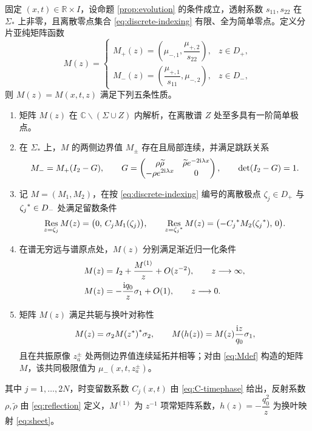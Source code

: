 \begin{proposition}\label{prop:jump}
固定 $(x,t)\in\mathbb R\times I$，设命题 \ref{prop:evolution} 的条件成立，透射系数 $s_{11},s_{22}$ 在 $\Sigma_*$ 上非零，且离散零点集合 \eqref{eq:discrete-indexing} 有限、全为简单零点。定义分片亚纯矩阵函数
\begin{equation}\label{eq:Mdef}
M(z)=\begin{cases}
M_+(z)=\left(\mu_{-,1},\dfrac{\mu_{+,2}}{s_{22}}\right),&z\in D_+,\\[6pt]
M_-(z)=\left(\dfrac{\mu_{+,1}}{s_{11}},\mu_{-,2}\right),&z\in D_-,
\end{cases}
\end{equation}
则 $M(z)=M(x,t,z)$ 满足下列五条性质。
\begin{enumerate}[(1)]
\item 矩阵 $M(z)$ 在 $\mathbb C\mathbin{\backslash}(\Sigma\cup Z)$ 内解析，在离散谱 $Z$ 处至多具有一阶简单极点。
\item 在 $\Sigma_*$ 上，$M$ 的两侧边界值 $M_\pm$ 存在且局部连续，并满足跳跃关系
\begin{equation}\label{eq:jump}
M_-=M_+(I_2-G),\qquad
G=\begin{pmatrix}
\rho\widetilde\rho&\widetilde\rho e^{-2\mathrm{i}\lambda x}\\
-\rho e^{2\mathrm{i}\lambda x}&0
\end{pmatrix},\qquad
\det(I_2-G)=1.
\end{equation}
\item 记 $M=(M_1,M_2)$，在按 \eqref{eq:discrete-indexing} 编号的离散极点 $\zeta_j\in D_+$ 与 ${\zeta_j}^{*}\in D_-$ 处满足留数条件
\begin{equation}\label{eq:M-residues}
\operatorname*{Res}\limits_{z=\zeta_j}M(z)=\bigl(0,\,C_jM_1(\zeta_j)\bigr),\qquad
\operatorname*{Res}\limits_{z={\zeta_j}^{*}}M(z)=\bigl(-{C_j}^{*}M_2({\zeta_j}^{*}),\,0\bigr).
\end{equation}
\item 在谱无穷远与谱原点处，$M(z)$ 分别满足渐近归一化条件
\begin{align}
&M(z)=I_2+\dfrac{M^{(1)}}{z}+O(z^{-2}),\qquad z\longrightarrow\infty,\label{eq:Minfty}\\
&M(z)=-\dfrac{\mathrm{i} q_0}{z}\sigma_1+O(1),\qquad z\longrightarrow0.\label{eq:Mzero}
\end{align}
\item 矩阵 $M(z)$ 满足共轭与换叶对称性
\begin{equation}\label{eq:Msym}
M(z)=\sigma_2{M({z}^{*})}^{*}\sigma_2,\qquad
M(h(z))=M(z)\dfrac{\mathrm{i} z}{q_0}\sigma_1,
\end{equation}
且在共振原像 $z_a^\pm$ 处两侧边界值连续延拓并相等；对由 \eqref{eq:Mdef} 构造的矩阵 $M$，该共同极限值为 $\mu_-(x,t,z_a^\pm)$。
\end{enumerate}
其中 $j=1,\ldots,2N$，时变留数系数 $C_j(x,t)$ 由 \eqref{eq:C-timephase} 给出，反射系数 $\rho,\widetilde\rho$ 由 \eqref{eq:reflection} 定义，$M^{(1)}$ 为 $z^{-1}$ 项常矩阵系数，$h(z)=-\dfrac{q_0^2}{z}$ 为换叶映射 \eqref{eq:sheet}。
\end{proposition}
